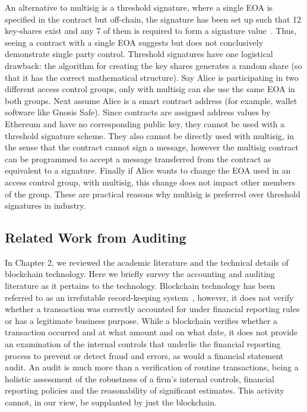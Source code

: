  An alternative to multisig is a threshold signature, where a single EOA is specified in the contract but off-chain, the signature has been set up such that 12 key-shares exist and any 7 of them is required to form a signature value~\cite{gennaro2018fast,zhao2019secure}. Thus, seeing a contract with a single EOA suggests but does not conclusively demonstrate single party control. Threshold signatures have one logistical drawback: the algorithm for creating the key shares generates a random share (so that it has the correct mathematical structure). Say Alice is participating in two different access control groups, only with multisig can she use the same EOA in both groups. Next assume Alice is a smart contract address (for example, wallet software like Gnosis Safe). Since contracts are assigned address values by Ethereum and have no corresponding public key, they cannot be used with a threshold signature scheme. They also cannot be directly used with multisig, in the sense that the contract cannot sign a message, however the multisig contract can be programmed to accept a message transferred from the contract as equivalent to a signature. Finally if Alice wants to change the EOA used in an access control group, with multisig, this change does not impact other members of the group. These are practical reasons why multisig is preferred over threshold signatures in industry. 


\subsection{Related Work from Auditing}

In Chapter 2, we reviewed the academic literature and the technical details of blockchain technology. Here we briefly survey the accounting and auditing literature as it pertains to the technology. Blockchain technology has been referred to as an irrefutable record-keeping system~\cite{crosby2016blockchain}, however, it does not verify whether a transaction was correctly accounted for under financial reporting rules or has a legitimate business purpose. While a blockchain verifies whether a transaction occurred and at what amount and on what date, it does not provide an examination of the internal controls that underlie the financial reporting process to prevent or detect fraud and errors, as would a financial statement audit. An audit is much more than a verification of routine transactions, being a holistic assessment of the robustness of a firm's internal controls, financial reporting policies and the reasonability of significant estimates. This activity cannot, in our view, be supplanted by just the blockchain.

